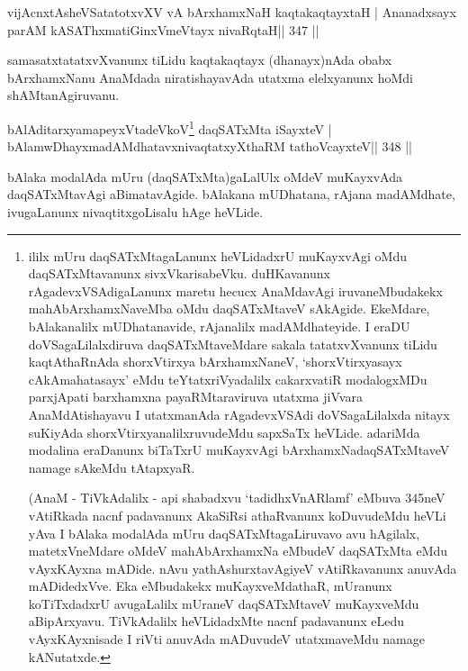 
\begin{shl}
vijAcnxtAsheVSatatotxvXV vA bArxhamxNaH kaqtakaqtayxtaH |
Ananadxsayx parAM kASAThxmatiGinxVmeVtayx nivaRqtaH\hfill || 347 ||
\end{shl}

\begin{artha}
samasatxtatatxvXvanunx tiLidu kaqtakaqtayx (dhanayx)nAda obabx bArxhamxNanu AnaMdada niratishayavAda utatxma elelxyanunx hoMdi shAMtanAgiruvanu.
\end{artha}


\begin{shl}
bAlAditarxyamapeyxVtadeVkoV\footnote{ililx mUru daqSATxMtagaLanunx heVLidadxrU muKayxvAgi 
oMdu daqSATxMtavanunx sivxVkarisabeVku. duHKavanunx 
rAgadevxVSAdigaLanunx maretu hecucx AnaMdavAgi iruvaneMbudakekx 
mahAbArxhamxNaveMba oMdu daqSATxMtaveV sAkAgide. EkeMdare, bAlakanalilx 
mUDhatanavide, rAjanalilx madAMdhateyide. I eraDU doVSagaLilalxdiruva 
daqSATxMtaveMdare sakala tatatxvXvanunx tiLidu kaqtAthaRnAda shorxVtirxya 
bArxhamxNaneV, `shorxVtirxyasayx cAkAmahatasayx' eMdu 
teYtatxriVyadalilx cakarxvatiR modalogxMDu parxjApati barxhamxna 
payaRMtaraviruva utatxma jiVvara AnaMdAtishayavu I utatxmanAda 
rAgadevxVSAdi doVSagaLilalxda nitayx suKiyAda shorxVtirxyanalilxruvudeMdu sapxSaTx heVLide. adariMda modalina eraDanunx biTaTxrU muKayxvAgi bArxhamxNadaqSATxMtaveV namage sAkeMdu tAtapxyaR. 

(AnaM - TiVkAdalilx - api shabadxvu `tadidhxVnARlamf' eMbuva 345neV 
vAtiRkada nacnf padavanunx AkaSiRsi athaRvanunx koDuvudeMdu heVLi yAva 
I bAlaka modalAda mUru daqSATxMtagaLiruvavo avu hAgilalx, 
matetxVneMdare oMdeV mahAbArxhamxNa eMbudeV daqSATxMta eMdu vAyxKAyxna 
mADide. nAvu yathAshurxtavAgiyeV vAtiRkavanunx anuvAda mADidedxVve. Eka 
eMbudakekx muKayxveMdathaR, mUranunx koTiTxdadxrU avugaLalilx mUraneV 
daqSATxMtaveV muKayxveMdu aBipArxyavu. TiVkAdalilx heVLidadxMte nacnf 
padavanunx eLedu vAyxKAyxnisade I riVti anuvAda mADuvudeV utatxmaveMdu namage kANutatxde.} daqSATxMta iSayxteV |
bAlamwDhayxmadAMdhatavxnivaqtatxyXthaRM tathoVcayxteV\hfill || 348 ||
\end{shl}

\begin{artha}
bAlaka modalAda mUru (daqSATxMta)gaLalUlx oMdeV muKayxvAda  daqSATxMtavAgi aBimatavAgide. bAlakana mUDhatana, rAjana madAMdhate, ivugaLanunx nivaqtitxgoLisalu hAge heVLide.
\end{artha}

